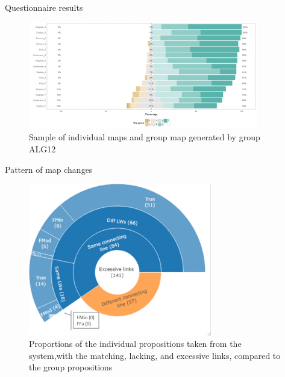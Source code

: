 \begin{frame}{Questionnaire results}
    \begin{figure}[tb]
    \begin{center}
        \includegraphics[width=100mm]{images/rqa_affective_response.pdf}
    \end{center}
    \caption{Sample of individual maps and group map generated by group ALG12}
    \label{a1::map_sample}
\end{figure}
\end{frame}

\begin{frame}{Pattern of map changes}
    \begin{figure}[tb]
    \begin{center}
        \includegraphics[width=80mm]{images/rqa_map_patterns_a.pdf}
    \end{center}
    \caption{Proportions of the individual propositions taken from the system,with  the  matching,  lacking,  and  excessive  links,  compared  to  the  group propositions}
    \label{a1::map_sample}
\end{figure}
\end{frame}

